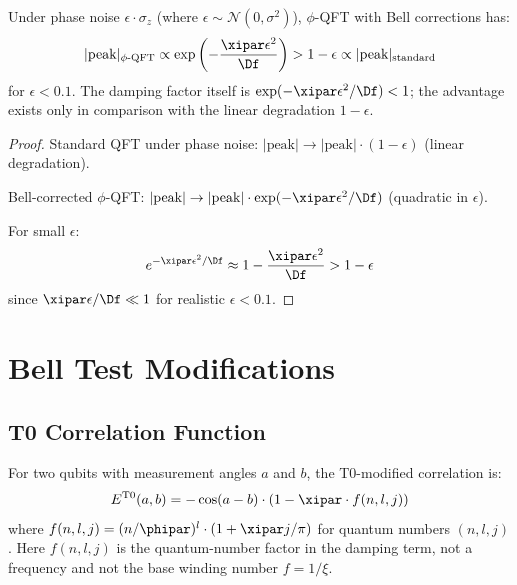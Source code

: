 \begin{corollary}
	\label{cor:stability}
	Under phase noise $\epsilon \cdot \sigma_z$ (where $\epsilon \sim \mathcal{N}(0, \sigma^2)$), $\phi$-QFT with Bell corrections has:
	\begin{equation}
		|\text{peak}|_{\text{$\phi$-QFT}} \propto \exp\left(-\frac{\xipar \epsilon^2}{\Df}\right) > 1 - \epsilon \propto |\text{peak}|_{\text{standard}}
	\end{equation}
	for $\epsilon < 0.1$. The damping factor itself is $\exp(-\xipar\epsilon^2/\Df) < 1$; the advantage exists only in comparison with the linear degradation $1 - \epsilon$.
\end{corollary}

\begin{proof}
	Standard QFT under phase noise: $|\text{peak}| \to |\text{peak}| \cdot (1 - \epsilon)$ (linear degradation).
	
	Bell-corrected $\phi$-QFT: $|\text{peak}| \to |\text{peak}| \cdot \exp(-\xipar\epsilon^2/\Df)$ (quadratic in $\epsilon$).
	
	For small $\epsilon$:
	\begin{equation}
		e^{-\xipar\epsilon^2/\Df} \approx 1 - \frac{\xipar\epsilon^2}{\Df} > 1 - \epsilon
	\end{equation}
	since $\xipar\epsilon/\Df \ll 1$ for realistic $\epsilon < 0.1$.
\end{proof}

\section{Bell Test Modifications}
\label{sec:bell}

\subsection{T0 Correlation Function}

\begin{definition}
	For two qubits with measurement angles $a$ and $b$, the T0-modified correlation is:
	\begin{equation}
		E^{\text{T0}}(a,b) = -\cos(a-b) \cdot \left(1 - \xipar \cdot f(n,l,j)\right)
		\label{eq:t0bell}
	\end{equation}
	where $f(n,l,j) = (n/\phipar)^l \cdot (1 + \xipar j/\pi)$ for quantum numbers $(n,l,j)$. Here $f(n,l,j)$ is the quantum-number factor in the damping term, not a frequency and not the base winding number $f = 1/\xi$.
\end{definition}

